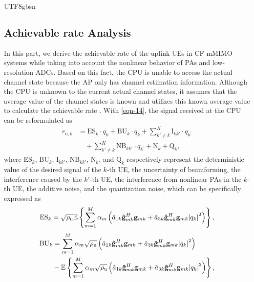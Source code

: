 \documentclass[lettersize,journal]{IEEEtran}
\begin{document}
\begin{CJK}{UTF8}{gbsn}
\subsection{Achievable rate Analysis}
In this part, we derive the achievable rate of the uplink UEs in CF-mMIMO systems while taking into account the nonlinear behavior of PAs and low-resolution ADCs. Based on this fact, the CPU is unable to access the actual channel state because the AP only has channel estimation information. Although the CPU is unknown to the current actual channel states, it assumes that the average value of the channel states is known and utilizes this known average value to calculate the achievable rate \cite{paper6}. With \eqref{eqn-14}, the signal received at the CPU can be reformulated as
\begin{align}\label{eqn-15}
{r_{\text{u},k}}& = {\text{ES}_k} \cdot {q_k} + {\text{BU}_k} \cdot {q_k} + \sum_{k' \ne k}^K {\text{I}_{kk'}} \cdot q_{k^\prime} \nonumber \\
&\quad+\sum_{k' \ne k}^K {\text{NB}_{kk'}} \cdot q_{k^\prime}  + {\text{N}_k} + {\text{Q}_k},
\end{align}
where ${\text{ES}_k}$, ${\text{BU}_k}$, ${\text{I}_{kk'}}$, ${\text{NB}_{kk'}}$, ${\text{N}_k}$, and ${\text{Q}_k}$ respectively represent the deterministic value of the desired signal of the $k$-th UE, the uncertainty of beamforming, the interference caused by the $k'$-th UE, the interference from nonlinear PAs in the $k$-th UE, the additive noise, and the quantization noise, which can be specifically expressed as
\begin{equation}\label{eqn-16}
{\text{ES}_k} = \sqrt {{\rho _\text{u}}} \mathbb{E}\left\{ {\sum_{m = 1}^M {\alpha _m}\left({\tilde{a} _{1k}}{\bf{\hat g}}_{mk}^H{{\bf{g}}_{mk}} + {\tilde{a} _{3k}}{\bf{\hat g}}_{mk}^H{{\bf{g}}_{mk}}{{\left| {{q_k}} \right|}^2}\right)} \right\},
\end{equation}
\begin{equation}\label{eqn-17}
\begin{aligned}{\text{BU}_k} &= \sum_{m = 1}^M \alpha_m \sqrt{\rho _\text{u}}\left({\tilde{a} _{1k}}{\bf{\hat g}}_{mk}^H{{\bf{g}}_{mk}} + {\tilde{a} _{3k}}{\bf{\hat g}}_{mk}^H{{\bf{g}}_{mk}}{\left| {{q_k}} \right|^2}\right)\\ 
&- \mathbb{E} \left\{ {\sum_{m = 1}^M {\alpha _m}\sqrt{\rho _\text{u}}\left({\tilde{a} _{1k}}{\bf{\hat g}}_{mk}^H{{\bf{g}}_{mk}} + {\tilde{a} _{3k}}{\bf{\hat g}}_{mk}^H{{\bf{g}}_{mk}}{{\left| {{q_k}} \right|}^2}\right)} \right\},
\end{aligned}\end{equation}

\end{CJK}
\end{document}
